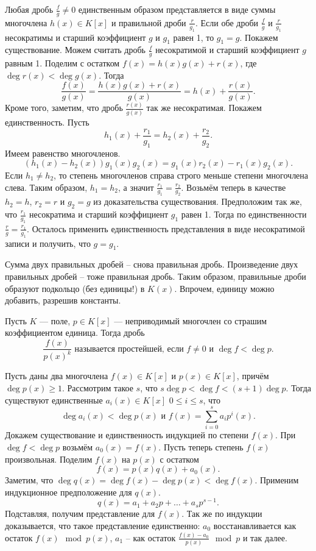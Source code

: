 \lm Любая дробь $\frac{f}{g}\neq 0$ единственным образом представляется в виде суммы многочлена $h(x)\in K[x]$ и правильной дроби $\frac{r}{g_1}$. Если обе дроби  $\frac{f}{g}$ и $\frac{r}{g_1}$ несократимы и старший коэффициент $g$ и $g_1$ равен 1, то $g_1=g$.
\proof Покажем существование. Можем считать дробь $\frac{f}{g}$ несократимой и старший коэффициент $g$ равным 1. Поделим с остатком $f(x)=h(x)g(x)+r(x)$, где $\deg r(x)<\deg g(x)$. Тогда
$$\frac{f(x)}{g(x)} =\frac{h(x)g(x)+r(x)}{g(x)} =h(x)+\frac{r(x)}{g(x)}.$$
Кроме того, заметим, что дробь $\frac{r(x)}{g(x)}$ так же несократимая.
Покажем единственность. Пусть
$$h_1(x)+\frac{r_1}{g_1}=h_2(x)+\frac{r_2}{g_2}.$$
Имеем равенство многочленов.
$$(h_1(x)-h_2(x))g_1(x)g_2(x)=g_1(x)r_2(x)-r_1(x)g_2(x).$$
Если $h_1\neq h_2$, то степень многочленов справа строго меньше степени многочлена слева. Таким образом, $h_1=h_2$, а значит $\frac{r_1}{g_1}=\frac{r_2}{g_2}$. Возьмём теперь в качестве $h_2=h$, $r_2=r$ и $g_2=g$ из доказательства существования. Предположим так же, что $\frac{r_1}{g_1}$ несократима и старший коэффициент $g_1$ равен 1. Тогда по единственности $\frac{r}{g}=\frac{r_1}{g_1}$. Осталось  применить единственность представления в виде несократимой записи и получить, что $g=g_1$.
\endproof
\elm

\rm Сумма двух правильных дробей -- снова правильная дробь. Произведение двух правильных дробей -- тоже правильная дробь. Таким образом, правильные дроби образуют подкольцо (без единицы!) в $K(x)$. Впрочем, единицу можно добавить, разрешив константы.
\erm

 Пусть $K$ --- поле, $p\in K[x]$ --- неприводимый многочлен со страшим коэффициентом единица. Тогда дробь
$$\frac{f(x)}{p(x)^{k}} \text{ называется простейшей, если $f \neq 0$ и $\deg f < \deg p$}. $$
\edfn

 Пусть даны два многочлена $f(x)\in K[x]$ и $p(x)\in K[x]$, причём $\deg p(x)\geq 1$. Рассмотрим такое $s$, что $s\deg p < \deg f < (s+1)\deg p$. Тогда существуют единственные $a_i(x)\in K[x]$ $0\leq i\leq s$, что 
$$\deg a_i(x) < \deg p(x) \text{ и } f(x)=\sum_{i=0}^sa_i p^i(x).$$
\elm
\proof Докажем существование и единственность индукцией по степени $f(x)$. При $\deg f < \deg p$ возьмём $a_0(x)=f(x)$. Пусть теперь степень $f(x)$ произвольная.  Поделим $f(x)$ на $p(x)$ с остатком $$f(x)=p(x)q(x)+a_0(x).$$
Заметим, что  $\deg q(x) = \deg f(x)-\deg p(x) <  \deg f(x)$. Применим индукционное предположение для $q(x)$. $$q(x)=a_1+a_2p+\dots+a_s p^{s-1}.$$
Подставляя, получим представление для $f(x)$. 
Так же по индукции доказывается, что такое представление единственно: $a_0$ восстанавливается как остаток $f(x) \mod p(x)$, $a_1$ -- как остаток $\frac{f(x)-a_0}{p(x)} \mod p$ и так далее.
\endproof

